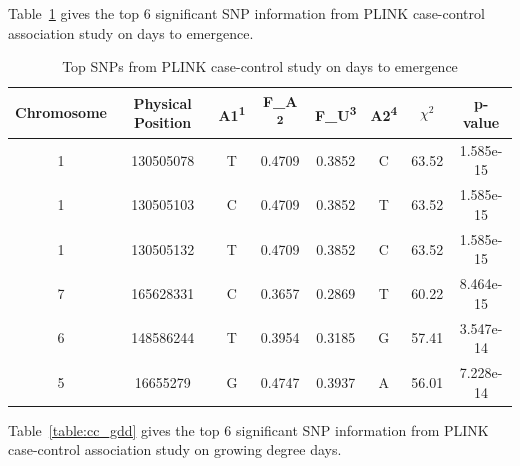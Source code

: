 \documentclass{article}
\begin{document}
Table~\ref{table:cc_dte} gives the top 6 significant SNP information from PLINK case-control association study on days to emergence.

\begin{table}[!h]
\centering
\begin{tabular}{|c|c|c|c|c|c|c|c|}
\hline
Chromosome & Physical Position & A1\textsuperscript{1} & F\_A \textsuperscript{2} & F\_U\textsuperscript{3} & A2\textsuperscript{4} & ${\chi}^2$ & p-value \\ [.5ex]
\hline
1 & 130505078 & T & 0.4709 & 0.3852 & C & 63.52 & 1.585e-15 \\
\hline
1 & 130505103 & C & 0.4709 & 0.3852 & T & 63.52 & 1.585e-15 \\
\hline
1 & 130505132 & T& 0.4709 & 0.3852 & C & 63.52 & 1.585e-15 \\
\hline
7 & 165628331 & C & 0.3657 & 0.2869 & T & 60.22 & 8.464e-15 \\
\hline
6 & 148586244 & T & 0.3954 & 0.3185 & G & 57.41 & 3.547e-14 \\
\hline
5 & 16655279 & G & 0.4747 & 0.3937 & A & 56.01 & 7.228e-14 \\
\hline
\end{tabular}
\caption{Top SNPs from PLINK case-control study on days to emergence}
\label{table:cc_dte}
\end{table}

Table~\ref{table:cc_gdd} gives the top 6 significant SNP information from PLINK case-control association study on growing degree days.
\end{document}
